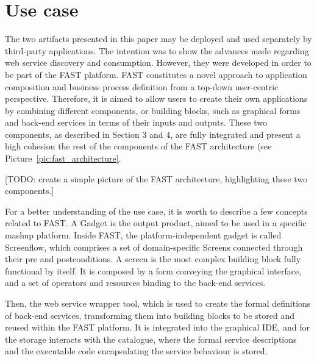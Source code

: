 
\section{Use case}
\label{sec:use_case}

The two artifacts presented in this paper may be deployed and used separately by third-party applications. The intention was to show the advances made regarding web service discovery and consumption. However, they were developed in order to be part of the FAST platform. FAST constitutes a novel approach to application composition and business process definition from a top-down user-centric perspective. Therefore, it is aimed to allow users to create their own applications by combining different components, or building blocks, such as graphical forms and back-end services in terms of their inputs and outputs. These two components, as described in Section 3 and 4, are fully integrated and present a high cohesion the rest of the components of the FAST architecture (see Picture~\ref{pic:fast_architecture}. 

[TODO: create a simple picture of the FAST architecture, highlighting these two components.]

For a better understanding of the use case, it is worth to describe a few concepts related to FAST. A Gadget is the output product, aimed to be used in a specific mashup platform. Inside FAST, the platform-independent gadget is called Screenflow, which comprises a set of domain-specific Screens connected through their pre and postconditions. A screen is the most complex building block fully functional by itself. It is composed by a form conveying the graphical interface, and a set of operators and resources binding to the back-end services.

Then, the web service wrapper tool, which is used to create the formal definitions of back-end services, transforming them into building blocks to be stored and reused within the FAST platform. It is integrated into the graphical IDE, and for the storage interacts with the catalogue, where the formal service descriptions and the executable code encapsulating the service behaviour is stored.


